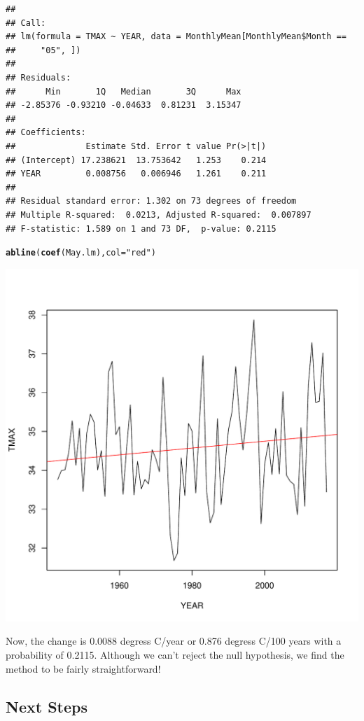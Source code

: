 \documentclass{article}\usepackage[]{graphicx}\usepackage[]{color}
\makeatletter
\def\maxwidth{ %
  \ifdim\Gin@nat@width>\linewidth
    \linewidth
  \else
    \Gin@nat@width
  \fi
}
\newcommand{\hlstr}[1]{\textcolor[rgb]{0.192,0.494,0.8}{#1}}%
\newcommand{\hlstd}[1]{\textcolor[rgb]{0.345,0.345,0.345}{#1}}%
\newcommand{\hlkwc}[1]{\textcolor[rgb]{0.333,0.667,0.333}{#1}}%
\newcommand{\hlkwd}[1]{\textcolor[rgb]{0.737,0.353,0.396}{\textbf{#1}}}%
\newenvironment{kframe}{%
 \def\at@end@of@kframe{}%
 \ifinner\ifhmode%
  \def\at@end@of@kframe{\end{minipage}}%
  \begin{minipage}{\columnwidth}%
 \fi\fi%
 \def\FrameCommand##1{\hskip\@totalleftmargin \hskip-\fboxsep
 \colorbox{shadecolor}{##1}\hskip-\fboxsep
     \hskip-\linewidth \hskip-\@totalleftmargin \hskip\columnwidth}%
 \MakeFramed {\advance\hsize-\width
   \@totalleftmargin\z@ \linewidth\hsize
   \@setminipage}}%
 {\par\unskip\endMakeFramed%
 \at@end@of@kframe}
\newenvironment{knitrout}{}{} %
\makeatother
\begin{document}
\begin{knitrout}
\begin{kframe}
\begin{verbatim}
## 
## Call:
## lm(formula = TMAX ~ YEAR, data = MonthlyMean[MonthlyMean$Month == 
##     "05", ])
## 
## Residuals:
##      Min       1Q   Median       3Q      Max 
## -2.85376 -0.93210 -0.04633  0.81231  3.15347 
## 
## Coefficients:
##              Estimate Std. Error t value Pr(>|t|)
## (Intercept) 17.238621  13.753642   1.253    0.214
## YEAR         0.008756   0.006946   1.261    0.211
## 
## Residual standard error: 1.302 on 73 degrees of freedom
## Multiple R-squared:  0.0213,	Adjusted R-squared:  0.007897 
## F-statistic: 1.589 on 1 and 73 DF,  p-value: 0.2115
\end{verbatim}
\begin{alltt}
\hlkwd{abline}\hlstd{(}\hlkwd{coef}\hlstd{(May.lm),} \hlkwc{col}\hlstd{=}\hlstr{"red"}\hlstd{)}
\end{alltt}
\end{kframe}
\includegraphics[width=\maxwidth]{figure/unnamed-chunk-21-2} 

\end{knitrout}

Now, the change is 0.0088 degress C/year or 0.876 degress C/100 years with a probability of 0.2115. Although we can't reject the null hypothesis, we find the method to be fairly straightforward! 

\subsection{Next Steps}
\end{document}
